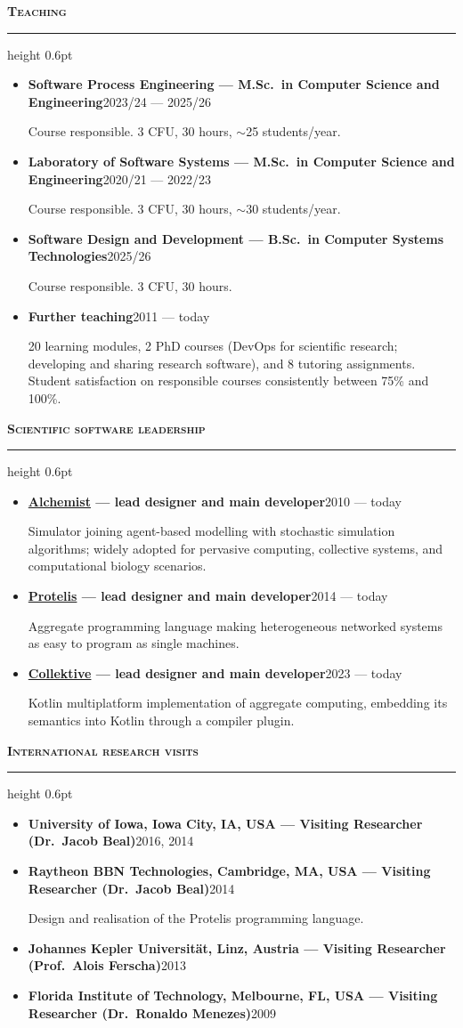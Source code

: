 \documentclass[a4paper,9pt]{extarticle}
\newcommand{\cvsection}[1]{%
  \par\vspace{3.5pt}%
  {\normalsize\bfseries\scshape #1}\par\vspace{1pt}%
  \hrule height 0.6pt\vspace{2.5pt}\par}
\newcommand{\entry}[2]{\textbf{#1}\hspace{1em}\hfill{\small #2}\par}
\begin{document}
\cvsection{Teaching}
\begin{itemize}
\item \entry{Software Process Engineering --- M.Sc.\ in Computer Science and Engineering}{2023/24 --- 2025/26}
      Course responsible. 3 CFU, 30 hours, $\sim$25 students/year.
\item \entry{Laboratory of Software Systems --- M.Sc.\ in Computer Science and Engineering}{2020/21 --- 2022/23}
      Course responsible. 3 CFU, 30 hours, $\sim$30 students/year.
\item \entry{Software Design and Development --- B.Sc.\ in Computer Systems Technologies}{2025/26}
      Course responsible. 3 CFU, 30 hours.
\item \entry{Further teaching}{2011 --- today}
      20 learning modules, 2 PhD courses (DevOps for scientific research; developing and sharing
      research software), and 8 tutoring assignments.
      Student satisfaction on responsible courses consistently between 75\% and 100\%.
\end{itemize}

\cvsection{Scientific software leadership}
\begin{itemize}
\item \entry{\href{http://alchemistsimulator.github.io/}{Alchemist} --- lead designer and main developer}{2010 --- today}
      Simulator joining agent-based modelling with stochastic simulation algorithms; widely
      adopted for pervasive computing, collective systems, and computational biology scenarios.
\item \entry{\href{http://protelis.org/}{Protelis} --- lead designer and main developer}{2014 --- today}
      Aggregate programming language making heterogeneous networked systems as easy to program
      as single machines.
\item \entry{\href{http://collektive.github.io/}{Collektive} --- lead designer and main developer}{2023 --- today}
      Kotlin multiplatform implementation of aggregate computing, embedding its semantics into
      Kotlin through a compiler plugin.
\end{itemize}

\cvsection{International research visits}
\begin{itemize}
\item \entry{University of Iowa, Iowa City, IA, USA --- Visiting Researcher (Dr.\ Jacob Beal)}{2016, 2014}
\item \entry{Raytheon BBN Technologies, Cambridge, MA, USA --- Visiting Researcher (Dr.\ Jacob Beal)}{2014}
      Design and realisation of the Protelis programming language.
\item \entry{Johannes Kepler Universit\"at, Linz, Austria --- Visiting Researcher (Prof.\ Alois Ferscha)}{2013}
\item \entry{Florida Institute of Technology, Melbourne, FL, USA --- Visiting Researcher (Dr.\ Ronaldo Menezes)}{2009}
\end{itemize}
\end{document}
